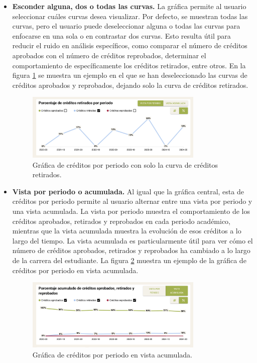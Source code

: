 \begin{itemize}
  \item \textbf{Esconder alguna, dos o todas las curvas.} La gráfica permite al usuario seleccionar cuáles curvas desea visualizar. Por defecto, se muestran todas las curvas, pero el usuario puede deseleccionar alguna o todas las curvas para enfocarse en una sola o en contrastar dos curvas. Esto resulta útil para reducir el ruido en análisis específicos, como comparar el número de créditos aprobados con el número de créditos reprobados, determinar el comportamiento de específicamente los créditos retirados, entre otros. En la figura \ref{fig:creditos_retirados} se muestra un ejemplo en el que se han deseleccionado las curvas de créditos aprobados y reprobados, dejando solo la curva de créditos retirados.
  
  \begin{figure}[H]
    \centering
    \includegraphics[width=0.8\textwidth]{img/nes/creditos_retirados.png}
    \caption{Gráfica de créditos por periodo con solo la curva de créditos retirados.}
    \label{fig:creditos_retirados}
  \end{figure}
  
  \item \textbf{Vista por periodo o acumulada.} Al igual que la gráfica central, esta de créditos por periodo permite al usuario alternar entre una vista por periodo y una vista acumulada. La vista por periodo muestra el comportamiento de los créditos aprobados, retirados y reprobados en cada periodo académico, mientras que la vista acumulada muestra la evolución de esos créditos a lo largo del tiempo. La vista acumulada es particularmente útil para ver cómo el número de créditos aprobados, retirados y reprobados ha cambiado a lo largo de la carrera del estudiante. La figura \ref{fig:creditos_acumulados} muestra un ejemplo de la gráfica de créditos por periodo en vista acumulada.
  
  \begin{figure}[H]
    \centering
    \includegraphics[width=0.8\textwidth]{img/nes/creditos_acumulados.png}
    \caption{Gráfica de créditos por periodo en vista acumulada.}
    \label{fig:creditos_acumulados}
  \end{figure}
  

\end{itemize}
